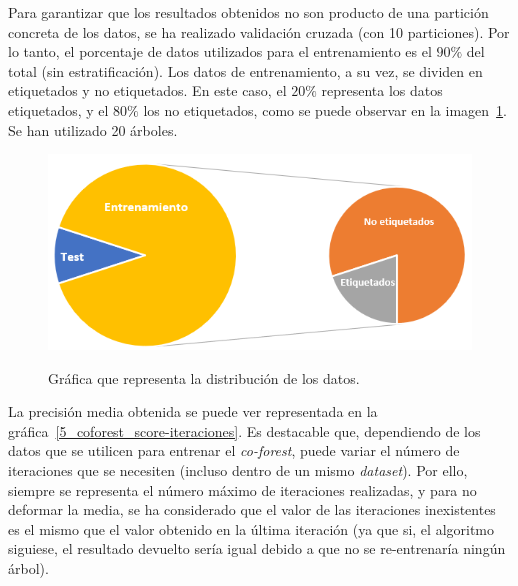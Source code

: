 Para garantizar que los resultados obtenidos no son producto de una partición concreta de los datos, se ha realizado validación cruzada (con 10 particiones). Por lo tanto, el porcentaje de datos utilizados para el entrenamiento es el $90\%$ del total (sin estratificación). Los datos de entrenamiento, a su vez, se dividen en etiquetados y no etiquetados. En este caso, el $20\%$ representa los datos etiquetados, y el $80\%$ los no etiquetados, como se puede observar en la imagen~\ref{5_entrenamiento_particiones}. Se han utilizado 20 árboles.

\begin{figure}[h]
	\caption{Gráfica que representa la distribución de los datos.}
	\centering
	\includegraphics[scale=0.75]{../img/memoria/5_entrenamiento_particiones}
	\label{5_entrenamiento_particiones}
\end{figure}


 La precisión media obtenida se puede ver representada en la gráfica~\ref{5_coforest_score-iteraciones}. Es destacable que, dependiendo de los datos que se utilicen para entrenar el \textit{co-forest}, puede variar el número de iteraciones que se necesiten (incluso dentro de un mismo \textit{dataset}). Por ello, siempre se representa el número máximo de iteraciones realizadas, y para no deformar la media, se ha considerado que el valor de las iteraciones inexistentes es el mismo que el valor obtenido en la última iteración (ya que si, el algoritmo siguiese, el resultado devuelto sería igual debido a que no se re-entrenaría ningún árbol).

